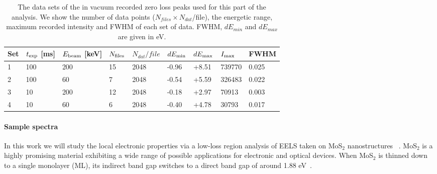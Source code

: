 \begin{table}[h]
  \renewcommand{\arraystretch}{1.40}
\begin{tabular}{|l|l|l|l|l|l|l|l|l|}
\toprule
Set & $t_{\rm exp}$ {[}ms{]} & $E_{\rm beam}$ {[}keV{]} & $N_{\rm files}$ & $N_{dat} / file$ & $dE_{\rm min}$  & $dE_{\rm max}$  & $I_{\rm max}$ & FWHM  \\ \hline
1        & 100                 & 200                  & 15          & 2048               & -0.96              & +8.51               & 739770       & 0.025         \\
2        & 100                 & 60                   & 7           & 2048               & -0.54              & +5.59               & 326483       & 0.022         \\
3        & 10                  & 200                  & 12          & 2048               & -0.18              & +2.97               & 70913        & 0.003         \\
4        & 10                  & 60                   & 6           & 2048               & -0.40              & +4.78               & 30793        & 0.017         \\ \bottomrule
\end{tabular}
\vspace{0.4cm}
\caption{The data sets of the in vacuum recorded zero loss peaks used for this part of the analysis. We show the number of data points ($N_{files}\times N_{dat}$/file), the energetic range, maximum recorded intensity and FWHM of each set of data. FWHM, $dE_{min}$ and $dE_{max}$ are given in eV.}
\label{table:vacuum}
\end{table}


\paragraph{Sample spectra}
%
In this work we will study the local electronic properties
via a low-loss region analysis of EELS taken on
MoS$_2$ nanostructures~ \cite{soniamos2}.
%
MoS$_2$ is a highly promising material exhibiting a wide range of possible applications for electronic and optical devices.
%
When MoS$_2$ is thinned down to a single monolayer (ML), its indirect band gap switches to a direct band gap of around 1.88 eV~\cite{Nerl:2016}.

